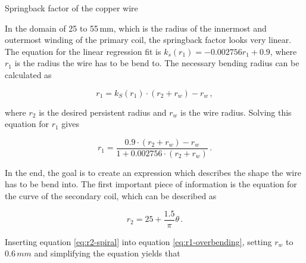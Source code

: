 \begin{marginfigure}[-1cm]
    \centering
    \caption{Springback factor of the copper wire}
    \label{fig:springback}
\end{marginfigure}

In the domain of 25 to 55\,mm, which is the radius of the innermost and outermost winding of the primary coil, the springback factor looks very linear. The equation for the linear regression fit is \(k_s(r_1) = -0.002756 r_1 + 0.9\), where \(r_1\) is the radius the wire has to be bend to. The necessary bending radius can be calculated as

\begin{equation}
    r_1 = k_S(r_1) \cdot \left(r_2 + r_w\right) - r_w\,,
\end{equation}

where \(r_2\) is the desired persistent radius and \(r_w\) is the wire radius. Solving this equation for \(r_1\) gives

\begin{equation}\label{eq:r1-overbending}
    r_1 = \frac{0.9 \cdot \left( r_2 + r_w \right) - r_w}{1 + 0.002756 \cdot \left(r_2 + r_w\right)}\,.
\end{equation}

In the end, the goal is to create an expression which describes the shape the wire has to be bend into. The first important piece of information is the equation for the curve of the secondary coil, which can be described as

\begin{equation}\label{eq:r2-spiral}
    r_2 = 25 + \frac{1.5}{\pi} \theta\,.
\end{equation}

Inserting equation \ref{eq:r2-spiral} into equation \ref{eq:r1-overbending}, setting \(r_w\) to \(0.6\,mm\) and simplifying the equation yields that

